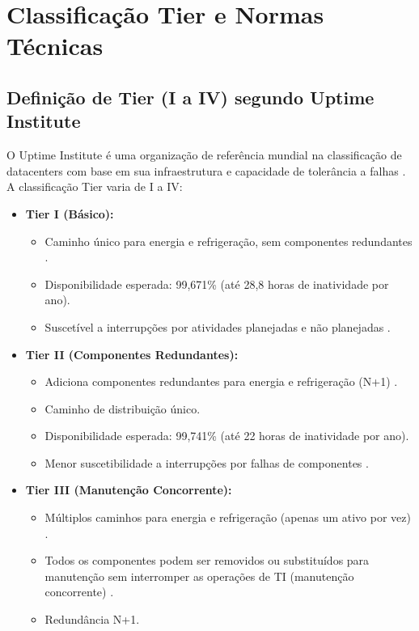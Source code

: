 \documentclass[
	12pt,				%
	oneside,			%
	a4paper,			%
	english,			%
	brazil				%
	]{abntex2unama}
\begin{document}
\chapter{Classificação Tier e Normas Técnicas}
\section{Definição de Tier (I a IV) segundo Uptime Institute}
O Uptime Institute é uma organização de referência mundial na classificação de datacenters com base em sua infraestrutura e capacidade de tolerância a falhas \cite{reliability_engineering}. A classificação Tier varia de I a IV:
\begin{itemize}
	\item \textbf{Tier I (Básico):}
	      \begin{itemize}
		      \item Caminho único para energia e refrigeração, sem componentes redundantes \cite{datacenter_monitoring}.
		      \item Disponibilidade esperada: 99,671\% (até 28,8 horas de inatividade por ano).
		      \item Suscetível a interrupções por atividades planejadas e não planejadas \cite{disaster_recovery}.
	      \end{itemize}
	\item \textbf{Tier II (Componentes Redundantes):}
	      \begin{itemize}
		      \item Adiciona componentes redundantes para energia e refrigeração (N+1) \cite{power_distribution}.
		      \item Caminho de distribuição único.
		      \item Disponibilidade esperada: 99,741\% (até 22 horas de inatividade por ano).
		      \item Menor suscetibilidade a interrupções por falhas de componentes \cite{datacenter_security}.
	      \end{itemize}
	\item \textbf{Tier III (Manutenção Concorrente):}
	      \begin{itemize}
		      \item Múltiplos caminhos para energia e refrigeração (apenas um ativo por vez) \cite{design_principles}.
		      \item Todos os componentes podem ser removidos ou substituídos para manutenção sem interromper as operações de TI (manutenção concorrente) \cite{datacenter_automation}.
		      \item Redundância N+1.

\end{itemize}
\end{itemize}
\end{document}
